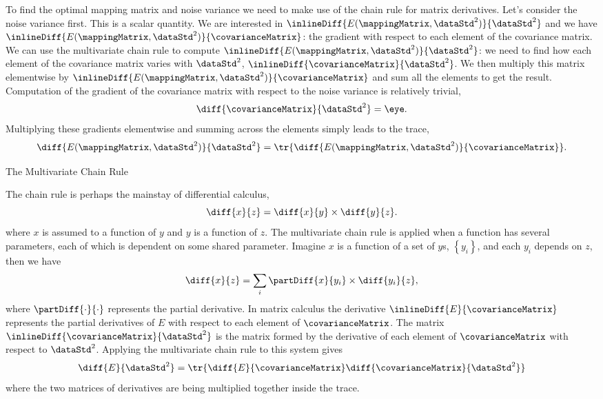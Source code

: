 To find the optimal mapping matrix and noise variance we need to make
use of the chain rule for matrix derivatives. Let's consider the noise
variance first. This is a scalar quantity. We are interested in
$\inlineDiff{E(\mappingMatrix, \dataStd^2)}{\dataStd^2}$ and we have
$\inlineDiff{E(\mappingMatrix, \dataStd^2)}{\covarianceMatrix}$: the
gradient with respect to each element of the covariance matrix. We can
use the multivariate chain rule to compute
$\inlineDiff{E(\mappingMatrix, \dataStd^2)}{\dataStd^2}$: we need to
find how each element of the covariance matrix varies with
$\dataStd^2$, $\inlineDiff{\covarianceMatrix}{\dataStd^2}$. We then
multiply this matrix elementwise by $\inlineDiff{E(\mappingMatrix,
  \dataStd^2)}{\covarianceMatrix}$ and sum all the elements to get the
result. Computation of the gradient of the covariance matrix with
respect to the noise variance is relatively trivial,
\[
\diff{\covarianceMatrix}{\dataStd^2} = \eye.
\]
Multiplying these gradients elementwise and summing across the
elements simply leads to the trace,
\[
\diff{E(\mappingMatrix, \dataStd^2)}{\dataStd^2} = \tr{\diff{E(\mappingMatrix, \dataStd^2)}{\covarianceMatrix}}.
\]
\begin{boxfloat}
  \caption{The Multivariate Chain Rule}\label{box:mvchainRule}

  \boxfontsize The chain rule is perhaps the mainstay of differential calculus,
  \[
  \diff{x}{z} = \diff{x}{y} \times \diff{y}{z}.
  \]
  where $x$ is assumed to a function of $y$ and $y$ is a function of
  $z$. The multivariate chain rule is applied when a function has
  several parameters, each of which is dependent on some shared
  parameter. Imagine $x$ is a function of a set of $y$s,
  $\left\{y_i\right\}$, and each $y_i$ depends on $z$, then we have
  \[
  \diff{x}{z} = \sum_{i}\partDiff{x}{y_i} \times \diff{y_i}{z},
  \]
  where $\partDiff{\cdot}{\cdot}$ represents the partial derivative.
  In matrix calculus the derivative
  $\inlineDiff{E}{\covarianceMatrix}$ represents the partial
  derivatives of $E$ with respect to each element of
  $\covarianceMatrix$. The matrix
  $\inlineDiff{\covarianceMatrix}{\dataStd^2}$ is the matrix formed by
  the derivative of each element of $\covarianceMatrix$ with respect
  to $\dataStd^2$. Applying the multivariate chain rule to this system
  gives
  \[
  \diff{E}{\dataStd^2} = \tr{\diff{E}{\covarianceMatrix} \diff{\covarianceMatrix}{\dataStd^2}}
  \]
  where the two matrices of derivatives are being multiplied together
  inside the trace.
\end{boxfloat}

